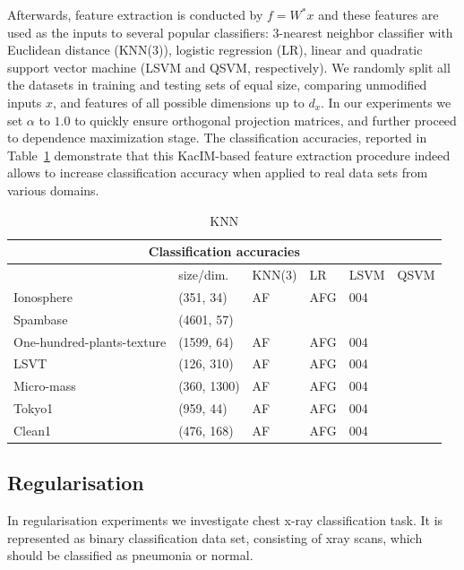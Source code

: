 \documentclass{article}
\begin{document}
\noindent Afterwards, feature extraction is conducted by $f = W^{*}x$ and these features are used as the inputs to several popular classifiers: $3$-nearest neighbor classifier with Euclidean distance (KNN(3)), logistic regression (LR), linear and quadratic support vector machine\cite{?} (LSVM and QSVM, respectively). We randomly split all the datasets in training and testing sets of equal size, comparing unmodified inputs $x$, and features of all possible dimensions up to $d_{x}$.  In our experiments we set $\alpha$ to $1.0$ to quickly ensure orthogonal projection matrices, and further proceed to dependence maximization stage. 
The classification accuracies, reported in Table~\ref{table:classification_accuracies} demonstrate that this KacIM-based feature extraction procedure indeed allows to increase classification accuracy when applied to real data sets from various domains.

\begin{table}	
\label{table:classification_accuracies}	
\centering
\begin{tabular}{ |p{3cm}|p{2.5cm}||p{1.5cm}|p{1cm}|p{1cm}|p{1cm}|  }
	\hline
	\multicolumn{6}{|c|}{Classification accuracies} \\
	\hline
	& size/dim. & KNN(3) & LR & LSVM & QSVM  \\
	\hline
	Ionosphere & (351, 34) & AF    &AFG&   004 & \\	
	\hline
	Spambase & (4601, 57) & & & & \\
	\hline
	One-hundred-plants-texture   & (1599, 64)
	  & AF    &AFG&   004 & \\
	\hline	
	LSVT  & (126, 310) & AF    &AFG&   004 & \\
	\hline
	Micro-mass  & (360, 1300)
	 & AF    &AFG&   004 & \\
	\hline	
	Tokyo1 & (959, 44) & AF    &AFG&   004 & \\
	\hline	
	Clean1 & (476, 168)
	 & AF    &AFG&   004 & \\
	\hline
\end{tabular}
\caption{KNN}
\end{table}

\subsection{Regularisation}
In regularisation experiments we investigate chest x-ray classification task. It is represented as binary classification data set, consisting of xray scans, which should be classified as pneumonia or normal.
\end{document}

